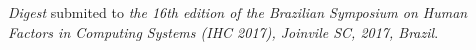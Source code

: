 \label{ap:B}

\textit{Digest} submited to \textit{the 16th edition of the Brazilian Symposium on Human Factors in Computing Systems (IHC 2017), Joinvile SC, 2017, Brazil}.

